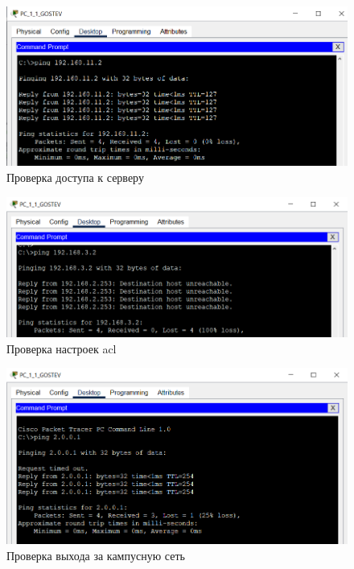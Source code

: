 \documentclass[14pt, a4paper]{extarticle}
\numberwithin{equation}{section}
\begin{document}
\begin{figure}[H]
        \centering
        \includegraphics[scale=0.7]{pt_server_ping.png}
        \caption{Проверка доступа к серверу}
        \label{fig:pt_server_access}
\end{figure}

\begin{figure}[H]
        \centering
        \includegraphics[scale=0.7]{pt_acl_ping.png}
        \caption{Проверка настроек acl}
        \label{fig:pt_acl_ping}
\end{figure}

\begin{figure}[H]
        \centering
        \includegraphics[scale=0.7]{pt_out_campus_ping.png}
        \caption{Проверка выхода за кампусную сеть}
        \label{fig:pt_out_campus}
\end{figure}
\end{document}
